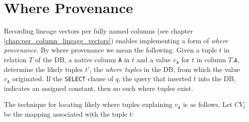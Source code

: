 \section{Where Provenance}
Recording lineage vectors per fully named columns (see chapter \ref{chap:per_column_lineage_vectors}) enables implementing a form of \textit{where provenance}. By where provenance we mean the following. Given a tuple $t$ in relation $T$ of the DB, a native column \texttt{A} in $t$ and a value $v_\texttt{A}$ for $t$ in column $T.\texttt{A}$, determine the likely tuples $t’$, the \textit{where tuples} in the DB, from which the value $v_\texttt{A}$ originated. If the \texttt{SELECT} clause of $q$, the query that inserted $t$ into the DB, indicates an assigned constant, then no such where tuples exist. 
\par The technique for locating likely where tuples explaining $v_\texttt{A}$ is as follows. Let $CV_t$ be the mapping associated with the tuple $t$:
